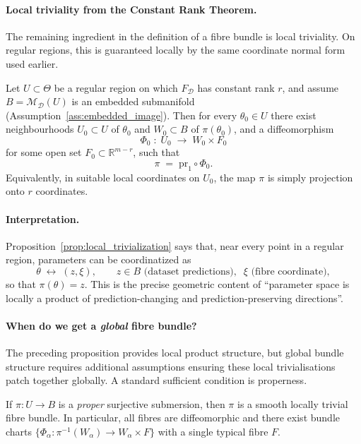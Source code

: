 \paragraph{Local triviality from the Constant Rank Theorem.}
The remaining ingredient in the definition of a fibre bundle is local triviality.
On regular regions, this is guaranteed locally by the same coordinate normal form used earlier.

\begin{gprop}
\label{prop:local_trivialization}
Let $U\subset\Theta$ be a regular region on which $F_{\mathcal D}$ has constant rank $r$,
and assume $B=\mathcal M_{\mathcal D}(U)$ is an embedded submanifold
(Assumption~\ref{ass:embedded_image}). Then for every $\theta_0\in U$ there exist
neighbourhoods $U_0\subset U$ of $\theta_0$ and $W_0\subset B$ of $\pi(\theta_0)$, and a diffeomorphism
\[
\Phi_{0} \;:\; U_0 \;\longrightarrow\; W_0 \times F_0
\]
for some open set $F_0\subset\mathbb R^{m-r}$, such that
\[
\pi \;=\; \mathrm{pr}_1 \circ \Phi_{0}.
\]
Equivalently, in suitable local coordinates on $U_0$, the map $\pi$ is simply projection onto
$r$ coordinates.
\end{gprop}

\paragraph{Interpretation.}
Proposition~\ref{prop:local_trivialization} says that, near every point in a regular region,
parameters can be coordinatized as
\[
\theta \;\longleftrightarrow\; (z,\xi),
\qquad
z\in B \text{ (dataset predictions)},\;\;\xi \text{ (fibre coordinate)},
\]
so that $\pi(\theta)=z$.
This is the precise geometric content of ``parameter space is locally a product of
prediction-changing and prediction-preserving directions''.

\paragraph{When do we get a \emph{global} fibre bundle?}
The preceding proposition provides local product structure, but global bundle structure
requires additional assumptions ensuring these local trivialisations patch together
globally. A standard sufficient condition is properness.

\begin{gthm}
\label{thm:ehresmann_fibration}
If $\pi:U\to B$ is a \emph{proper} surjective submersion, then $\pi$ is a smooth locally trivial
fibre bundle. In particular, all fibres are diffeomorphic and there exist bundle charts
$\{\Phi_\alpha:\pi^{-1}(W_\alpha)\to W_\alpha\times F\}$ with a single typical fibre $F$.
\end{gthm}

